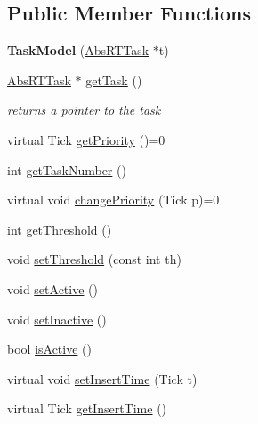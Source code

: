 \subsection*{Public Member Functions}
\begin{DoxyCompactItemize}
\item 
{\bfseries Task\+Model} (\hyperlink{classRTSim_1_1AbsRTTask}{Abs\+R\+T\+Task} $\ast$t)\hypertarget{classRTSim_1_1TaskModel_a035f64fa95fa393c0a0926163c8918db}{}\label{classRTSim_1_1TaskModel_a035f64fa95fa393c0a0926163c8918db}

\item 
\hyperlink{classRTSim_1_1AbsRTTask}{Abs\+R\+T\+Task} $\ast$ \hyperlink{classRTSim_1_1TaskModel_aeff5715f67329ac6bdd00422c951a891}{get\+Task} ()\hypertarget{classRTSim_1_1TaskModel_aeff5715f67329ac6bdd00422c951a891}{}\label{classRTSim_1_1TaskModel_aeff5715f67329ac6bdd00422c951a891}

\begin{DoxyCompactList}\small\item\em returns a pointer to the task \end{DoxyCompactList}\item 
virtual Tick \hyperlink{classRTSim_1_1TaskModel_af74a60be11ce2cd7c6a6a88817ac29d2}{get\+Priority} ()=0
\item 
int \hyperlink{classRTSim_1_1TaskModel_af3e0bebca242d854e3fcee3b7a6000b9}{get\+Task\+Number} ()
\item 
virtual void \hyperlink{classRTSim_1_1TaskModel_a3921ca24921e12dfd9bb9861ba57a590}{change\+Priority} (Tick p)=0
\item 
int \hyperlink{classRTSim_1_1TaskModel_af2b085da6d15d0b1d67ce488f4c46e22}{get\+Threshold} ()
\item 
void \hyperlink{classRTSim_1_1TaskModel_ac08203a081b17bdc0cd348ad0e57f0e5}{set\+Threshold} (const int th)
\item 
void \hyperlink{classRTSim_1_1TaskModel_a753fbcb09318cabf27e172fce47f2fe5}{set\+Active} ()
\item 
void \hyperlink{classRTSim_1_1TaskModel_a2c8e7b5b594730396e188eca818d91be}{set\+Inactive} ()
\item 
bool \hyperlink{classRTSim_1_1TaskModel_abe3242f278b69dcec8ca77ddb25dce79}{is\+Active} ()
\item 
virtual void \hyperlink{classRTSim_1_1TaskModel_a835447c7582d411ecf268a4f7f425fb4}{set\+Insert\+Time} (Tick t)
\item 
virtual Tick \hyperlink{classRTSim_1_1TaskModel_a89326e34b8a2dd8e64297f2315cd7d73}{get\+Insert\+Time} ()
\end{DoxyCompactItemize}
